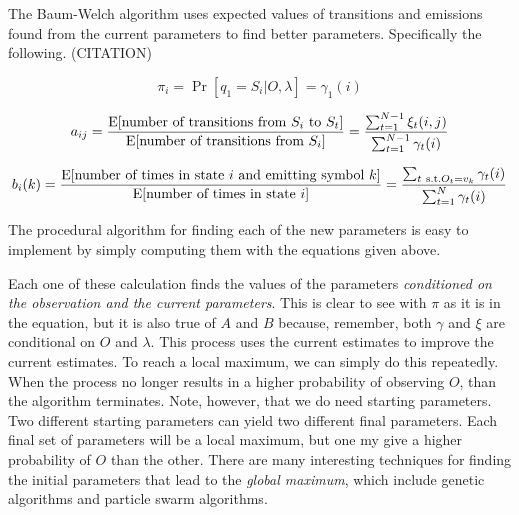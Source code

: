 The Baum-Welch algorithm uses expected values of transitions and
emissions found from the current parameters to find better parameters.
Specifically the following. (CITATION)

\begin{equation}
  \pi_i = \Pr[q_1 = S_i \vert O,\lambda] = \gamma_1(i)
\end{equation}

\begin{equation}
  a_{ij} = \frac{\mathrm{E}[\textrm{number of transitions from $S_i$ to
  $S_t$}]}{\mathrm{E}[\textrm{number of transitions from $S_i$}]} =
  \frac{\sum_{t=1}^{N-1} \xi_t(i,j)}{\sum_{t=1}^{N-1} \gamma_t(i)}
\end{equation}

\begin{equation}
  b_i(k) = \frac{\E[\textrm{number of times in state $i$ and emitting symbol
  $k$}]}{\E[\textrm{number of times in state $i$}]} = \frac{\sum_{t\ \textrm{s.t.} O_t = v_k} \gamma_t(i)}{\sum_{t=1}^N \gamma_t(i)}
\end{equation}

The procedural algorithm for finding each of the new parameters is easy
to implement by simply computing them with the equations given above.

Each one of these calculation finds the values of the parameters
\emph{conditioned on the observation and the current parameters}.
This is clear to see with $\pi$ as it is in the equation, but it is
also true of $A$ and $B$ because, remember, both $\gamma$ and $\xi$
are conditional on $O$ and $\lambda$. This process uses the current
estimates to improve the current estimates. To reach a local maximum,
we can simply do this repeatedly. When the process no longer results in
a higher probability of observing $O$, than the algorithm terminates.
Note, however, that we do need starting parameters. Two different
starting parameters can yield two different final parameters. Each final
set of parameters will be a local maximum, but one my give a higher
probability of $O$ than the other. There are many interesting techniques
for finding the initial parameters that lead to the \emph{global
maximum}, which include genetic algorithms and particle swarm
algorithms. \cite{fang2012investigation}
